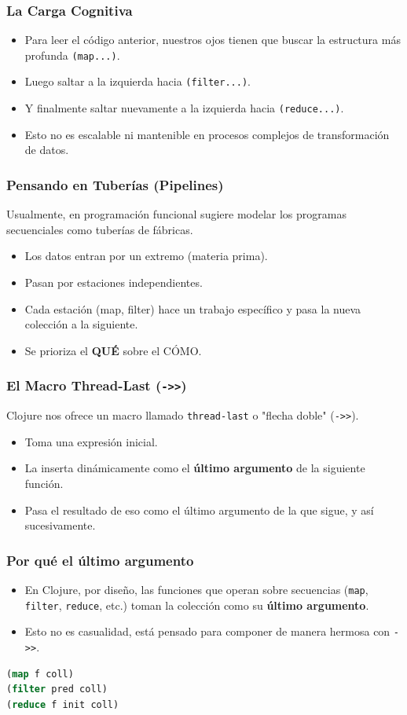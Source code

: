 \documentclass{beamer}
\begin{document}
\begin{frame}
    \frametitle{La Carga Cognitiva}
    \begin{itemize}
        \item Para leer el código anterior, nuestros ojos tienen que buscar la estructura más profunda \texttt{(map...)}.
        \item Luego saltar a la izquierda hacia \texttt{(filter...)}.
        \item Y finalmente saltar nuevamente a la izquierda hacia \texttt{(reduce...)}.
        \item Esto no es escalable ni mantenible en procesos complejos de transformación de datos.
    \end{itemize}
\end{frame}

\begin{frame}
    \frametitle{Pensando en Tuberías (Pipelines)}
    Usualmente, en programación funcional sugiere modelar los programas secuenciales como tuberías de fábricas.
    \begin{itemize}
        \item Los datos entran por un extremo (materia prima).
        \item Pasan por estaciones independientes.
        \item Cada estación (map, filter) hace un trabajo específico y pasa la nueva colección a la siguiente.
        \item Se prioriza el \textbf{QUÉ} sobre el CÓMO.
    \end{itemize}
\end{frame}

\begin{frame}[fragile]
    \frametitle{El Macro Thread-Last (\texttt{->>})}
    Clojure nos ofrece un macro llamado \texttt{thread-last} o "flecha doble" (\texttt{->>}).
    \begin{itemize}
        \item Toma una expresión inicial.
        \item La inserta dinámicamente como el \textbf{último argumento} de la siguiente función.
        \item Pasa el resultado de eso como el último argumento de la que sigue, y así sucesivamente.
    \end{itemize}
\end{frame}

\begin{frame}[fragile]
    \frametitle{Por qué el último argumento}
    \begin{itemize}
        \item En Clojure, por diseño, las funciones que operan sobre secuencias (\texttt{map}, \texttt{filter}, \texttt{reduce}, etc.) toman la colección como su \textbf{último argumento}.
        \item Esto no es casualidad, está pensado para componer de manera hermosa con \texttt{->>}.
    \end{itemize}
    \begin{lstlisting}[language=Clojure]
(map f coll)
(filter pred coll)
(reduce f init coll)
    \end{lstlisting}
\end{frame}
\end{document}
